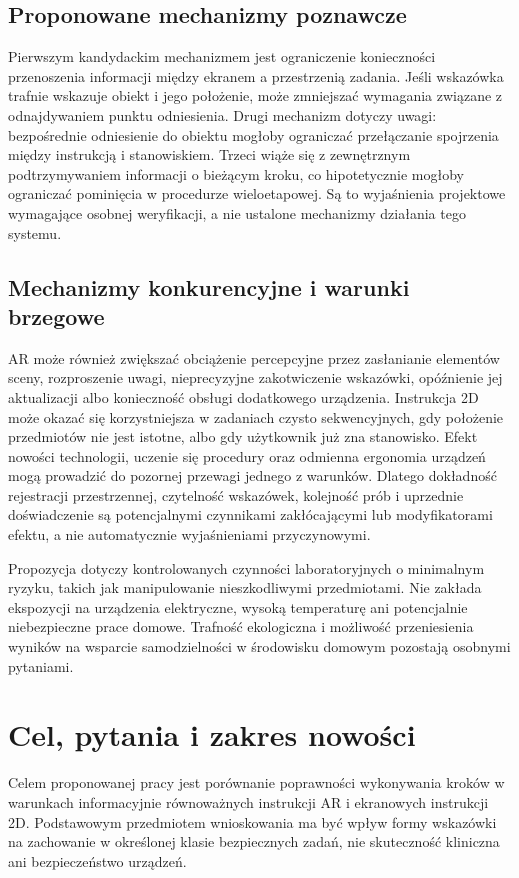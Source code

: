 \documentclass[11pt,a4paper]{article}
\begin{document}
\subsection{Proponowane mechanizmy poznawcze}
Pierwszym kandydackim mechanizmem jest ograniczenie konieczności przenoszenia informacji między ekranem a przestrzenią zadania. Jeśli wskazówka trafnie wskazuje obiekt i jego położenie, może zmniejszać wymagania związane z odnajdywaniem punktu odniesienia. Drugi mechanizm dotyczy uwagi: bezpośrednie odniesienie do obiektu mogłoby ograniczać przełączanie spojrzenia między instrukcją i stanowiskiem. Trzeci wiąże się z zewnętrznym podtrzymywaniem informacji o bieżącym kroku, co hipotetycznie mogłoby ograniczać pominięcia w procedurze wieloetapowej. Są to wyjaśnienia projektowe wymagające osobnej weryfikacji, a nie ustalone mechanizmy działania tego systemu.

\subsection{Mechanizmy konkurencyjne i warunki brzegowe}
AR może również zwiększać obciążenie percepcyjne przez zasłanianie elementów sceny, rozproszenie uwagi, nieprecyzyjne zakotwiczenie wskazówki, opóźnienie jej aktualizacji albo konieczność obsługi dodatkowego urządzenia. Instrukcja 2D może okazać się korzystniejsza w zadaniach czysto sekwencyjnych, gdy położenie przedmiotów nie jest istotne, albo gdy użytkownik już zna stanowisko. Efekt nowości technologii, uczenie się procedury oraz odmienna ergonomia urządzeń mogą prowadzić do pozornej przewagi jednego z warunków. Dlatego dokładność rejestracji przestrzennej, czytelność wskazówek, kolejność prób i uprzednie doświadczenie są potencjalnymi czynnikami zakłócającymi lub modyfikatorami efektu, a nie automatycznie wyjaśnieniami przyczynowymi.

Propozycja dotyczy kontrolowanych czynności laboratoryjnych o minimalnym ryzyku, takich jak manipulowanie nieszkodliwymi przedmiotami. Nie zakłada ekspozycji na urządzenia elektryczne, wysoką temperaturę ani potencjalnie niebezpieczne prace domowe. Trafność ekologiczna i możliwość przeniesienia wyników na wsparcie samodzielności w środowisku domowym pozostają osobnymi pytaniami.

\section{Cel, pytania i zakres nowości}
Celem proponowanej pracy jest porównanie poprawności wykonywania kroków w warunkach informacyjnie równoważnych instrukcji AR i ekranowych instrukcji 2D. Podstawowym przedmiotem wnioskowania ma być wpływ formy wskazówki na zachowanie w określonej klasie bezpiecznych zadań, nie skuteczność kliniczna ani bezpieczeństwo urządzeń.
\end{document}
